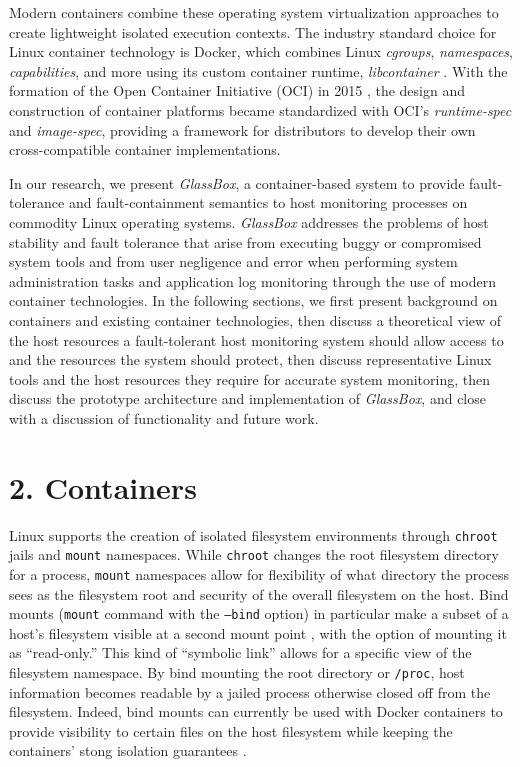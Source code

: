 \documentclass{proc}
\begin{document}
Modern containers combine these operating system virtualization approaches to create lightweight isolated execution contexts. The industry standard choice for Linux container technology is Docker, which combines Linux \textit{cgroups}, \textit{namespaces}, \textit{capabilities}, and more using its custom container runtime, \textit{libcontainer} \cite{hykes2014libcontainer}. With the formation of the Open Container Initiative (OCI) in 2015 \cite{opencontainerinitiative}, the design and construction of container platforms became standardized with OCI's \textit{runtime-spec} and \textit{image-spec}, providing a framework for distributors to develop their own cross-compatible container implementations.

In our research, we present \textit{GlassBox}, a container-based system to provide fault-tolerance and fault-containment semantics to host monitoring processes on commodity Linux operating systems. \textit{GlassBox} addresses the problems of host stability and fault tolerance that arise from executing buggy or compromised system tools and from user negligence and error when performing system administration tasks and application log monitoring through the use of modern container technologies. In the following sections, we first present background on containers and existing container technologies, then discuss a theoretical view of the host resources a fault-tolerant host monitoring system should allow access to and the resources the system should protect, then discuss representative Linux tools and the host resources they require for accurate system monitoring, then discuss the prototype architecture and implementation of \textit{GlassBox}, and close with a discussion of functionality and future work.

\section*{2. Containers}

Linux supports the creation of isolated filesystem environments through \texttt{chroot} jails and \texttt{mount} namespaces. While \texttt{chroot} changes the root filesystem directory for a process, \texttt{mount} namespaces allow for flexibility of what directory the process sees as the filesystem root and security of the overall filesystem on the host. Bind mounts (\texttt{mount} command with the \texttt{--bind} option) in particular make a subset of a host's filesystem visible at a second mount point \cite{bindmount}, with the option of mounting it as ``read-only.'' This kind of ``symbolic link'' allows for a specific view of the filesystem namespace. By bind mounting the root directory or \texttt{/proc}, host information becomes readable by a jailed process otherwise closed off from the filesystem. Indeed, bind mounts can currently be used with Docker containers to provide visibility to certain files on the host filesystem while keeping the containers' stong isolation guarantees \cite{dockerdoc}.
\end{document}

